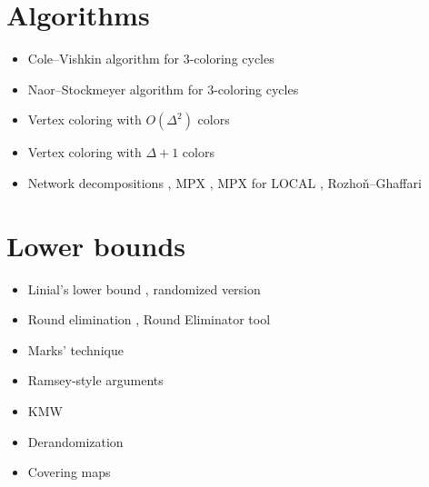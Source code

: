 \documentclass[a4paper,11pt]{article}
\begin{document}
\section{Algorithms}
\begin{itemize}
    \item Cole--Vishkin algorithm for 3-coloring cycles \cite{cole-vishkin-1986-deterministic-coin-tossing-with,goldberg-plotkin-shannon-1988-parallel-symmetry}
    \item Naor--Stockmeyer algorithm for 3-coloring cycles \cite{naor-stockmeyer-1995-what-can-be-computed-locally}
    \item Vertex coloring with $O(\Delta^2)$ colors \cite{linial-1992-locality-in-distributed-graph-algorithms}
    \item Vertex coloring with $\Delta+1$ colors \cite{maus-tonoyan-2022-linial-for-lists,barenboim-elkin-goldenberg-2022-locally-iterative}
    \item Network decompositions \cite{awerbuch-goldberg-etal-1989-network-decomposition-and}, MPX \cite{miller-peng-xu-2013-parallel-graph-decompositions-using}, MPX for LOCAL \cite{elkin-neiman-2022-distributed-strong-diameter-network}, Rozhoň--Ghaffari \cite{rozhon-ghaffari-2020-polylogarithmic-time-deterministic}
\end{itemize}

\section{Lower bounds}
\begin{itemize}
    \item Linial's lower bound \cite{linial-1992-locality-in-distributed-graph-algorithms}, randomized version \cite{naor-1991-a-lower-bound-on-probabilistic-algorithms-for}
    \item Round elimination \cite{brandt-2019-an-automatic-speedup-theorem-for,brandt-fischer-etal-2016-a-lower-bound-for-the}, Round Eliminator tool \cite{olivetti-2020-brief-announcement-round-eliminator-a,olivetti-2025-round-eliminator-a-tool-for-automatic}
    \item Marks' technique \cite{marks-2016-a-determinacy-approach-to-borel,brandt-chang-etal-2022-local-problems-on-trees-from-the}
    \item Ramsey-style arguments \cite{naor-stockmeyer-1995-what-can-be-computed-locally,czygrinow-hanckowiak-wawrzyniak-2008-fast-distributed}
    \item KMW \cite{kuhn-moscibroda-wattenhofer-2004-what-cannot-be,kuhn-moscibroda-wattenhofer-2006-the-price-of-being,kuhn-moscibroda-wattenhofer-2016-local-computation,coupette-lenzen-2021-a-breezing-proof-of-the-kmw-bound}
    \item Derandomization \cite{naor-stockmeyer-1995-what-can-be-computed-locally,chang-kopelowitz-pettie-2019-an-exponential-separation,dahal-d-amore-etal-2023-brief-announcement-distributed}
    \item Covering maps \cite{angluin-1980-local-and-global-properties-in-networks-of,yamashita-kameda-1996-computing-on-anonymous-networks}
\end{itemize}
\end{document}
